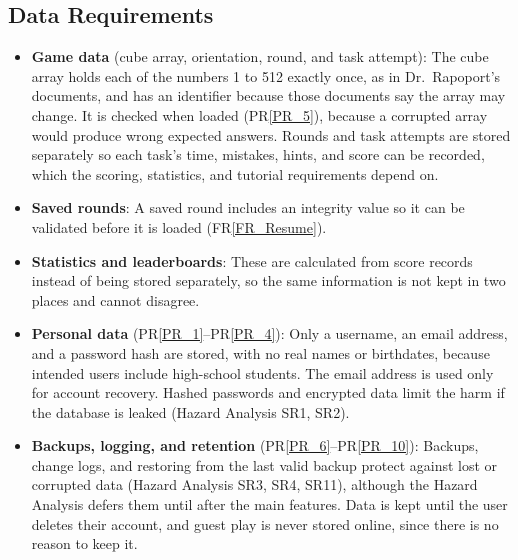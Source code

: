 \documentclass[12pt]{article}
\newcommand{\rref}[1]{FR\ref{#1}}
\newcommand{\prref}[1]{PR\ref{#1}}
\begin{document}
\subsection{Data Requirements}

\begin{itemize}
\item \textbf{Game data} (cube array, orientation, round, and task attempt): \newline
The cube array holds each of the numbers 1 to 512 exactly once, as in Dr.\ Rapoport's documents, and has an identifier because those documents say the array may change. It is checked when loaded (\prref{PR_5}), because a corrupted array would produce wrong expected answers. Rounds and task attempts are stored separately so each task's time, mistakes, hints, and score can be recorded, which the scoring, statistics, and tutorial requirements depend on.

\item \textbf{Saved rounds}: \newline
A saved round includes an integrity value so it can be validated before it is loaded (\rref{FR_Resume}).

\item \textbf{Statistics and leaderboards}: \newline
These are calculated from score records instead of being stored separately, so the same information is not kept in two places and cannot disagree.

\item \textbf{Personal data} (\prref{PR_1}--\prref{PR_4}): \newline
Only a username, an email address, and a password hash are stored, with no real names or birthdates, because intended users include high-school students. The email address is used only for account recovery. Hashed passwords and encrypted data limit the harm if the database is leaked (Hazard Analysis SR1, SR2).

\item \textbf{Backups, logging, and retention} (\prref{PR_6}--\prref{PR_10}): \newline
Backups, change logs, and restoring from the last valid backup protect against lost or corrupted data (Hazard Analysis SR3, SR4, SR11), although the Hazard Analysis defers them until after the main features. Data is kept until the user deletes their account, and guest play is never stored online, since there is no reason to keep it.

\end{itemize}
\end{document}
